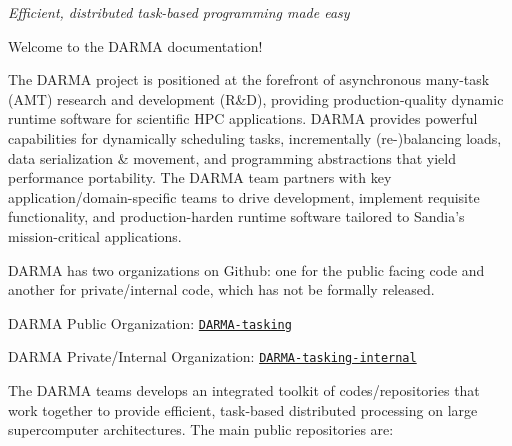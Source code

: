 {\itshape Efficient, distributed task-\/based programming made easy}

Welcome to the D\+A\+R\+MA documentation!

The D\+A\+R\+MA project is positioned at the forefront of asynchronous many-\/task (A\+MT) research and development (R\&D), providing production-\/quality dynamic runtime software for scientific H\+PC applications. D\+A\+R\+MA provides powerful capabilities for dynamically scheduling tasks, incrementally (re-\/)balancing loads, data serialization \& movement, and programming abstractions that yield performance portability. The D\+A\+R\+MA team partners with key application/domain-\/specific teams to drive development, implement requisite functionality, and production-\/harden runtime software tailored to Sandia’s mission-\/critical applications.

D\+A\+R\+MA has two organizations on Github\+: one for the public facing code and another for private/internal code, which has not be formally released.


\begin{DoxyItemize}
\item D\+A\+R\+MA Public Organization\+: \href{https://github.com/DARMA-tasking}{\tt D\+A\+R\+M\+A-\/tasking}
\item D\+A\+R\+MA Private/\+Internal Organization\+: \href{https://github.com/DARMA-tasking-internal}{\tt D\+A\+R\+M\+A-\/tasking-\/internal}
\end{DoxyItemize}

The D\+A\+R\+MA teams develops an integrated toolkit of codes/repositories that work together to provide efficient, task-\/based distributed processing on large supercomputer architectures. The main public repositories are\+:

